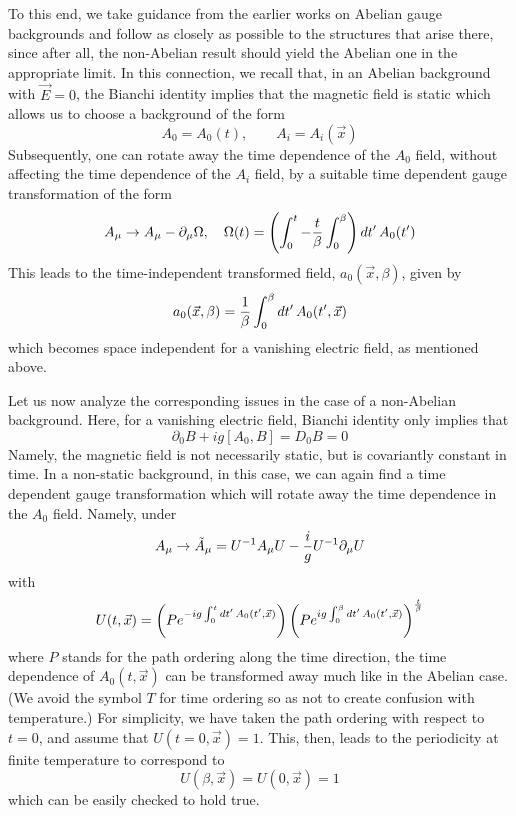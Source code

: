 \documentclass[a4paper,12pt]{article}
\begin{document}
To this end, we take guidance from the earlier
works on Abelian gauge backgrounds and follow as closely as
possible to the structures that arise there, since after all, the
non-Abelian result should yield the Abelian one in the appropriate
limit. In this connection, we recall that, in
an Abelian background with $\vec{E}=0$, the Bianchi
identity implies that the magnetic field is static which allows us to
choose a background of the form
\[
A_{0} = A_{0}(t),\qquad A_{i} = A_{i}(\vec{x})
\]
Subsequently, one can rotate away the time dependence of the $A_{0}$
field, without affecting the time dependence of the $A_{i}$ field, by a
suitable time dependent gauge transformation of the form
\begin{equation}
A_{\mu}\rightarrow A_{\mu} - \partial_{\mu}\Omega,\quad \Omega(t) =
\left(\int_{0}^{t} - {t\over \beta}\int_{0}^{\beta}\right)
dt'\,A_{0}(t')\label{abelian}
\end{equation}
This leads to the time-independent transformed field,
$a_{0}(\vec{x},\beta)$, given by
\begin{equation}
a_{0}(\vec{x},\beta) = {1\over \beta} \int_{0}^{\beta}
dt'\,A_{0}(t',\vec{x})\label{abelian1}
\end{equation}
which becomes space independent for a vanishing electric field, as
mentioned above.

Let us now analyze the corresponding issues in the case of a
non-Abelian background. Here, for a vanishing electric field, Bianchi
identity only implies that
\begin{equation}
\partial_{0}B + ig \left[A_{0},B\right] = D_{0}B = 0\label{31}
\end{equation}
Namely, the magnetic field is not necessarily static, but is
covariantly constant in time. In a
non-static background, in this case, we can again find a time
dependent  gauge transformation which will rotate away the time
dependence in the $A_{0}$ field. Namely, under
\begin{equation}
A_{\mu}\rightarrow \tilde{A}_{\mu} = U^{-1}A_{\mu}U - {i\over g}
U^{-1}\partial_{\mu}U 
\end{equation}
with
\begin{equation}
U(t, \vec{x}) = \left(P e^{-ig\int_{0}^{t}
    dt'\,A_{0}(t',\vec{x})}\right)\left(P e^{ig\int_{0}^{\beta}
    dt'\,A_{0}(t',\vec{x})}\right)^{{t\over\beta}}\label{32}
\end{equation}
where $P$ stands for the path ordering along the time
direction, the time dependence of $A_{0}(t,\vec{x})$ can be
transformed away 
much like in the Abelian case. (We avoid the symbol $T$ for time
ordering so as not to create confusion with temperature.) For
simplicity, we have taken the path ordering with respect to $t=0$,
and assume that $U(t=0,\vec{x}) = 1$.
This, then, leads to the periodicity at finite temperature to
correspond to
\[
U(\beta,\vec{x}) = U(0,\vec{x}) = 1
\]
which can be easily checked to hold true. 
\end{document}
